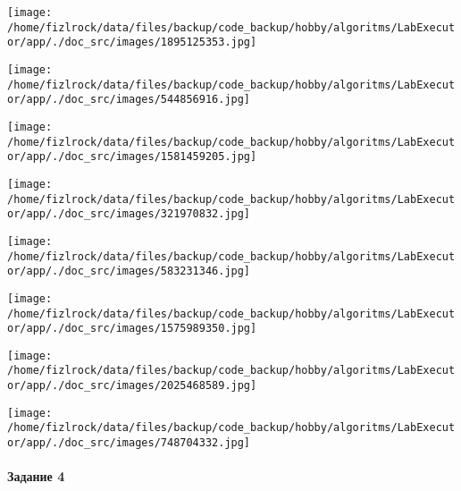 \documentclass[a4paper, 12pt]{article}
\begin{document}
\texttt{[image: /home/fizlrock/data/files/backup/code\_backup/hobby/algoritms/LabExecutor/app/./doc\_src/images/1895125353.jpg]}

\texttt{[image: /home/fizlrock/data/files/backup/code\_backup/hobby/algoritms/LabExecutor/app/./doc\_src/images/544856916.jpg]}

\texttt{[image: /home/fizlrock/data/files/backup/code\_backup/hobby/algoritms/LabExecutor/app/./doc\_src/images/1581459205.jpg]}

\texttt{[image: /home/fizlrock/data/files/backup/code\_backup/hobby/algoritms/LabExecutor/app/./doc\_src/images/321970832.jpg]}

\texttt{[image: /home/fizlrock/data/files/backup/code\_backup/hobby/algoritms/LabExecutor/app/./doc\_src/images/583231346.jpg]}

\texttt{[image: /home/fizlrock/data/files/backup/code\_backup/hobby/algoritms/LabExecutor/app/./doc\_src/images/1575989350.jpg]}

\texttt{[image: /home/fizlrock/data/files/backup/code\_backup/hobby/algoritms/LabExecutor/app/./doc\_src/images/2025468589.jpg]}

\texttt{[image: /home/fizlrock/data/files/backup/code\_backup/hobby/algoritms/LabExecutor/app/./doc\_src/images/748704332.jpg]}
\pagebreak
\paragraph{Задание 4}
\end{document}
